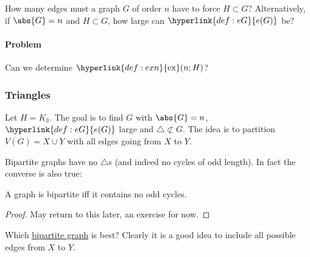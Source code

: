 \documentclass{article}
\DeclareMathOperator{\ext}{ex}
\begin{document}
How many edges must a graph $G$ of order $n$ have to force $H \subset G$? Alternatively, if $\abs{G} = n$ and $H \subset G$, how large can $\hyperlink{def:eG}{e(G)}$ be?


\paragraph{Problem} Can we determine $\hyperlink{def:exn}{\ext}(n; H)$?

\subsubsection{Triangles}
Let $H = K_3$. The goal is to find $G$ with $\abs{G} = n$, $\hyperlink{def:eG}{e(G)}$ large and $\triangle \not\subset G$.
The idea is to partition $V(G) = X \cup Y$ with all edges going from $X$ to $Y$.


Bipartite graphs have no $\triangle$s (and indeed no cycles of odd length). In fact the converse is also true:
\begin{nthm}\label{thm:7}
    A graph is bipartite iff it contains no odd cycles.
\end{nthm}

\begin{proof}
    May return to this later, an exercise for now.
\end{proof}

Which \hyperlink{def:bipartite}{bipartite graph} is best?
Clearly it is a good idea to include all possible edges from $X$ to $Y$.

\end{document}
